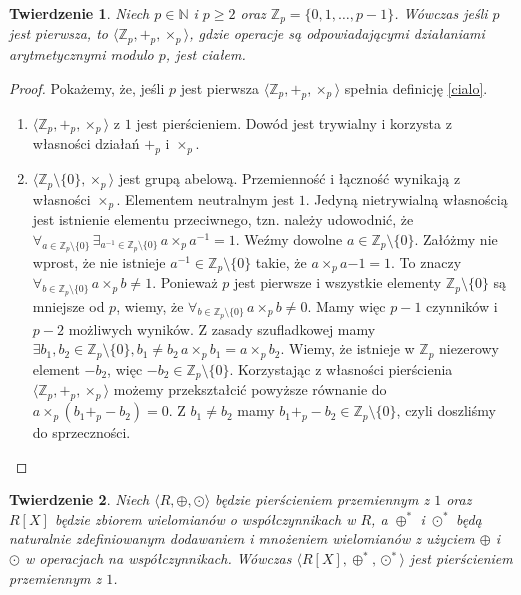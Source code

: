 \documentclass[polish,declaration,shortabstract]{iithesis}
\theoremstyle{definition}
\theoremstyle{remark} \newtheorem{observation}{Obserwacja}
\theoremstyle{plain} \newtheorem{theorem}{Twierdzenie}
\theoremstyle{plain} \newtheorem{lemma}{Lemat}
\theoremstyle{remark} \newtheorem*{remark*}{Uwaga}
\theoremstyle{reminder} \newtheorem*{reminder*}{Przypomnienie}
\begin{document}
\begin{theorem}
	Niech $p \in \mathbb{N}$ i $p \geq 2$ oraz $\mathbb{Z}_p = \{0, 1, \ldots, p-1\}$. Wówczas jeśli $p$ jest pierwsza, to $\langle \mathbb{Z}_p, +_p, \times_p \rangle$, gdzie operacje są odpowiadającymi działaniami arytmetycznymi modulo $p$, jest ciałem.
\end{theorem}

\begin{proof}
	Pokażemy, że, jeśli $p$ jest pierwsza $\langle \mathbb{Z}_p, +_p, \times_p \rangle$ spełnia definicję \ref{cialo}.
	\begin{enumerate}[label=(\arabic*),leftmargin=.4in]
		\item $\langle \mathbb{Z}_p, +_p, \times_p \rangle$ z $1$ jest pierścieniem. Dowód jest trywialny i korzysta z własności działań $+_p$ i $\times_p$.
		\item $\langle \mathbb{Z}_p \setminus \{0\}, \times_p \rangle$ jest grupą abelową. Przemienność i łączność wynikają z własności $\times_p$. Elementem neutralnym jest $1$. Jedyną nietrywialną własnością jest istnienie elementu przeciwnego, tzn. należy udowodnić, że $\forall_{a \in \mathbb{Z}_p \setminus \{0\}} \, \exists_{a^{-1} \in \mathbb{Z}_p \setminus \{0\}} \, a \times_p a^{-1} = 1$.\newline
		      Weźmy dowolne $a \in \mathbb{Z}_p \setminus \{0\}$. Załóżmy nie wprost, że nie istnieje $a^{-1} \in \mathbb{Z}_p \setminus \{0\}$ takie, że $a \times_p a{-1} = 1$. To znaczy $\forall_{b \in \mathbb{Z}_p \setminus \{0\}} \, a \times_p b \neq 1$. Ponieważ $p$ jest pierwsze i wszystkie elementy $\mathbb{Z}_p \setminus \{0\}$ są mniejsze od $p$, wiemy, że $\forall_{b \in \mathbb{Z}_p \setminus \{0\}} \, a \times_p b \neq 0$. Mamy więc $p-1$ czynników i $p-2$ możliwych wyników. Z zasady szufladkowej mamy $\exists{b_1, b_2 \in \mathbb{Z}_p \setminus \{0\}}, b_1 \neq b_2 \, a \times_p b_1 = a \times_p b_2$. Wiemy, że istnieje w $\mathbb{Z}_p$ niezerowy element $-b_2$, więc $-b_2 \in \mathbb{Z}_p \setminus \{0\}$. Korzystając z własności pierścienia $\langle \mathbb{Z}_p, +_p, \times_p \rangle$ możemy przekształcić powyższe równanie do $a \times_p (b_1 +_p -b_2) = 0$. Z $b_1 \neq b_2$ mamy $b_1 +_p -b_2 \in \mathbb{Z}_p \setminus \{0\}$, czyli doszliśmy do sprzeczności.
	\end{enumerate}
\end{proof}

\begin{theorem}
    Niech $\langle R, \oplus, \odot \rangle$ będzie pierścieniem przemiennym z $1$ oraz $R[X]$ będzie zbiorem wielomianów o współczynnikach w $R$, a $\oplus^*$ i $\odot^*$ będą naturalnie zdefiniowanym dodawaniem i mnożeniem wielomianów z użyciem $\oplus$ i $\odot$ w operacjach na współczynnikach. Wówczas
	$\langle R[X], \oplus^{*}, \odot^{*} \rangle$ jest pierścieniem przemiennym z $1$.
\end{theorem}
\end{document}
